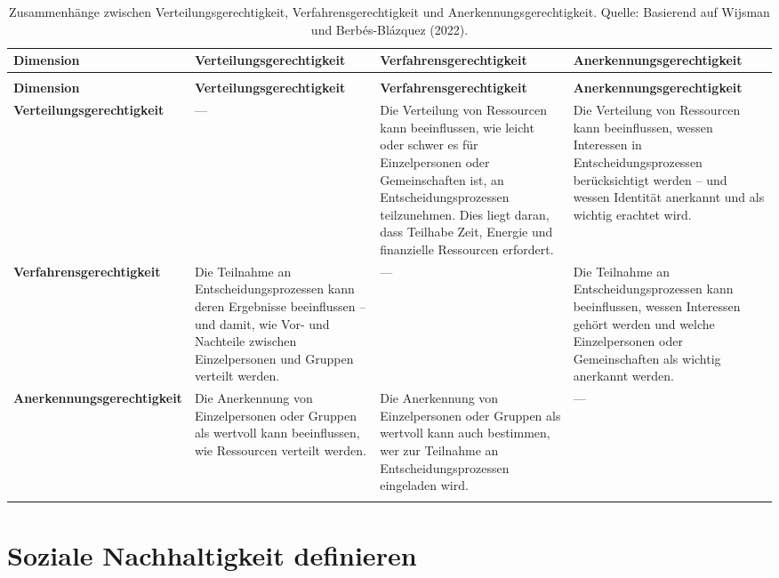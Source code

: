 \documentclass[
  nswissgerman,
  a4paper,
  openany]{book}
\begin{document}
\begin{longtable}[t]{>{\raggedright\arraybackslash}p{1.6cm}>{\raggedright\arraybackslash}p{3.25cm}>{\raggedright\arraybackslash}p{3.25cm}>{\raggedright\arraybackslash}p{3.25cm}}

\caption{\label{tbl-justice}Zusammenhänge zwischen
Verteilungsgerechtigkeit, Verfahrensgerechtigkeit und
Anerkennungsgerechtigkeit. Quelle: Basierend auf Wijsman und
Berbés-Blázquez (2022).}

\tabularnewline

\toprule
\textbf{Dimension} & \textbf{Verteilungsgerechtigkeit} & \textbf{Verfahrensgerechtigkeit} & \textbf{Anerkennungsgerechtigkeit}\\
\midrule
\endfirsthead
\multicolumn{4}{@{}l}{\textit{(continued)}}\\
\toprule
\textbf{Dimension} & \textbf{Verteilungsgerechtigkeit} & \textbf{Verfahrensgerechtigkeit} & \textbf{Anerkennungsgerechtigkeit}\\
\midrule
\endhead

\endfoot
\bottomrule
\endlastfoot
\textbf{Verteilungsgerechtigkeit} & — & Die Verteilung von Ressourcen kann beeinflussen, wie leicht oder schwer es für Einzelpersonen oder Gemeinschaften ist, an Entscheidungsprozessen teilzunehmen. Dies liegt daran, dass Teilhabe Zeit, Energie und finanzielle Ressourcen erfordert. & Die Verteilung von Ressourcen kann beeinflussen, wessen Interessen in Entscheidungsprozessen berücksichtigt werden – und wessen Identität anerkannt und als wichtig erachtet wird.\\
\textbf{Verfahrensgerechtigkeit} & Die Teilnahme an Entscheidungsprozessen kann deren Ergebnisse beeinflussen – und damit, wie Vor- und Nachteile zwischen Einzelpersonen und Gruppen verteilt werden. & — & Die Teilnahme an Entscheidungsprozessen kann beeinflussen, wessen Interessen gehört werden und welche Einzelpersonen oder Gemeinschaften als wichtig anerkannt werden.\\
\textbf{Anerkennungsgerechtigkeit} & Die Anerkennung von Einzelpersonen oder Gruppen als wertvoll kann beeinflussen, wie Ressourcen verteilt werden. & Die Anerkennung von Einzelpersonen oder Gruppen als wertvoll kann auch bestimmen, wer zur Teilnahme an Entscheidungsprozessen eingeladen wird. & —\\*

\end{longtable}

\endgroup{}

\section{Soziale Nachhaltigkeit
definieren}\label{soziale-nachhaltigkeit-definieren}
\end{document}
